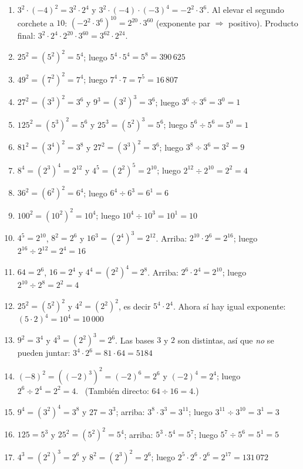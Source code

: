 \documentclass[12pt, letterpaper]{article}
\begin{document}
\begin{enumerate}[leftmargin=*, label=\textbf{\arabic*.}]
  \item $3^2 \cdot (-4)^2 = 3^2 \cdot 2^4$ y $3^2 \cdot (-4) \cdot (-3)^4 = -2^2 \cdot 3^6$. Al elevar el segundo corchete a $10$: $\left(-2^2 \cdot 3^6\right)^{10} = 2^{20} \cdot 3^{60}$ (exponente par $\Rightarrow$ positivo). Producto final: $3^2 \cdot 2^4 \cdot 2^{20} \cdot 3^{60} = 3^{62} \cdot 2^{24}$.
  \item $25^2 = (5^2)^2 = 5^4$; luego $5^4 \cdot 5^4 = 5^8 = 390\,625$
  \item $49^2 = (7^2)^2 = 7^4$; luego $7^4 \cdot 7 = 7^5 = 16\,807$
  \item $27^2 = (3^3)^2 = 3^6$ y $9^3 = (3^2)^3 = 3^6$; luego $3^6 \div 3^6 = 3^0 = 1$
  \item $125^2 = (5^3)^2 = 5^6$ y $25^3 = (5^2)^3 = 5^6$; luego $5^6 \div 5^6 = 5^0 = 1$
  \item $81^2 = (3^4)^2 = 3^8$ y $27^2 = (3^3)^2 = 3^6$; luego $3^8 \div 3^6 = 3^2 = 9$
  \item $8^4 = (2^3)^4 = 2^{12}$ y $4^5 = (2^2)^5 = 2^{10}$; luego $2^{12} \div 2^{10} = 2^2 = 4$
  \item $36^2 = (6^2)^2 = 6^4$; luego $6^4 \div 6^3 = 6^1 = 6$
  \item $100^2 = (10^2)^2 = 10^4$; luego $10^4 \div 10^3 = 10^1 = 10$
  \item $4^5 = 2^{10}$, $8^2 = 2^6$ y $16^3 = (2^4)^3 = 2^{12}$. Arriba: $2^{10} \cdot 2^6 = 2^{16}$; luego $2^{16} \div 2^{12} = 2^4 = 16$
  \item $64 = 2^6$, $16 = 2^4$ y $4^4 = (2^2)^4 = 2^8$. Arriba: $2^6 \cdot 2^4 = 2^{10}$; luego $2^{10} \div 2^8 = 2^2 = 4$
  \item $25^2 = (5^2)^2$ y $4^2 = (2^2)^2$, es decir $5^4 \cdot 2^4$. Ahora sí hay igual exponente: $(5 \cdot 2)^4 = 10^4 = 10\,000$
  \item $9^2 = 3^4$ y $4^3 = (2^2)^3 = 2^6$. Las bases $3$ y $2$ son distintas, así que \emph{no} se pueden juntar: $3^4 \cdot 2^6 = 81 \cdot 64 = 5184$
  \item $(-8)^2 = \left((-2)^3\right)^2 = (-2)^6 = 2^6$ y $(-2)^4 = 2^4$; luego $2^6 \div 2^4 = 2^2 = 4$. \ (También directo: $64 \div 16 = 4$.)
  \item $9^4 = (3^2)^4 = 3^8$ y $27 = 3^3$; arriba: $3^8 \cdot 3^3 = 3^{11}$; luego $3^{11} \div 3^{10} = 3^1 = 3$
  \item $125 = 5^3$ y $25^2 = (5^2)^2 = 5^4$; arriba: $5^3 \cdot 5^4 = 5^7$; luego $5^7 \div 5^6 = 5^1 = 5$
  \item $4^3 = (2^2)^3 = 2^6$ y $8^2 = (2^3)^2 = 2^6$; luego $2^5 \cdot 2^6 \cdot 2^6 = 2^{17} = 131\,072$

\end{enumerate}
\end{document}
